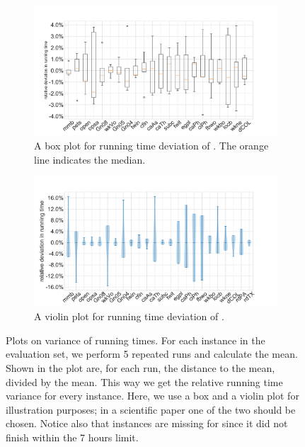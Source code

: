 \documentclass[algorithms,article,submit,moreauthors,pdftex]{Definitions/mdpi}
\newcommand{\changed}[1]{#1}
\newcommand{\changeComment}[1]{}
\begin{document}
\begin{figure}[t]
\centering
\begin{subfigure}{.48\textwidth}
	\includegraphics[scale=0.21]{relRunTimeDev_RK.pdf}
	\caption{A box plot for running time deviation of \rk. The orange line indicates the median.}
	\label{fig:box}
\end{subfigure}
\hfill
\begin{subfigure}{0.48\textwidth}
	\includegraphics[scale=0.21]{relRunTimeDev_Kad.pdf}
	\caption{A violin plot for running time deviation of \kad. }	
	\label{fig:violin}
\end{subfigure}

\caption{
Plots on variance of running times. \changeComment{Switched order of plots.}
For each instance in the evaluation set, we perform 5 repeated runs and calculate the mean.
Shown in the plot are, for each run, the distance to the mean, divided by the mean.
This way we get the relative running time variance for every instance.
Here, we use a box and a violin plot for illustration purposes; in a scientific paper one of the two
should be chosen.
Notice also that instances \changed{\onlyKadInstances } are missing for \rk since it did not finish
within the 7 hours limit.
}
\end{figure}
\end{document}
